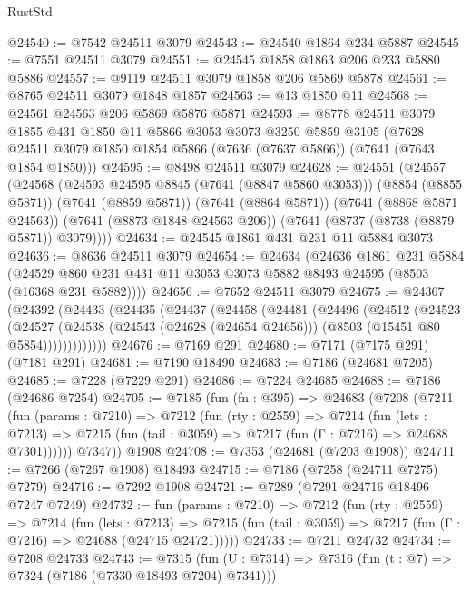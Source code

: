 \begin{lexlean}{RustStd}
\begin{coremodule}
{\begin{coremodule}
{{{{{{{{{{{{{{{{{{{{{{{{{{{{{{{{@24540 := @7542 @24511 @3079
@24543 := @24540 @1864 @234 @5887
@24545 := @7551 @24511 @3079
@24551 := @24545 @1858 @1863 @206 @233 @5880 @5886
@24557 := @9119 @24511 @3079 @1858 @206 @5869 @5878
@24561 := @8765 @24511 @3079 @1848 @1857
@24563 := @13 @1850 @11
@24568 := @24561 @24563 @206 @5869 @5876 @5871
@24593 := @8778
    @24511
    @3079
    @1855
    @431
    @1850
    @11
    @5866
    @3053
    @3073
    @3250
    @5859
    @3105
    (@7628 @24511 @3079 @1850 @1854 @5866 (@7636 (@7637 @5866)) (@7641 (@7643 @1854 @1850)))
@24595 := @8498 @24511 @3079
@24628 := @24551
    (@24557
      (@24568
        (@24593 @24595 @8845 (@7641 (@8847 @5860 @3053)))
        (@8854 (@8855 @5871))
        (@7641 (@8859 @5871))
        (@7641 (@8864 @5871))
        (@7641 (@8868 @5871 @24563))
        (@7641 (@8873 @1848 @24563 @206))
        (@7641 (@8737 (@8738 (@8879 @5871)) @3079))))
@24634 := @24545 @1861 @431 @231 @11 @5884 @3073
@24636 := @8636 @24511 @3079
@24654 := @24634
    (@24636
      @1861
      @231
      @5884
      (@24529 @860 @231 @431 @11 @3053 @3073 @5882 @8493 @24595 (@8503 (@16368 @231 @5882))))
@24656 := @7652 @24511 @3079
@24675 := @24367
    (@24392
      (@24433
        (@24435
          (@24437
            (@24458
              (@24481
                (@24496
                  (@24512
                    (@24523
                      (@24527
                        (@24538
                          (@24543 (@24628 (@24654 @24656)))
                          (@8503 (@15451 @80 @5854)))))))))))))
@24676 := @7169 @291
@24680 := @7171 (@7175 @291) (@7181 @291)
@24681 := @7190 @18490
@24683 := @7186 (@24681 @7205)
@24685 := @7228 (@7229 @291)
@24686 := @7224 @24685
@24688 := @7186 (@24686 @7254)
@24705 := @7185
    (fun (fn : @395) =>
    @24683
      (@7208
        (@7211
          (fun (params : @7210) =>
          @7212
            (fun (rty : @2559) =>
            @7214
              (fun (lets : @7213) =>
              @7215 (fun (tail : @3059) => @7217 (fun (Γ : @7216) => @24688 @7301))))))
        @7347))
    @1908
@24708 := @7353 (@24681 (@7203 @1908))
@24711 := @7266 (@7267 @1908) @18493
@24715 := @7186 (@7258 (@24711 @7275) @7279)
@24716 := @7292 @1908
@24721 := @7289 (@7291 @24716 @18496 @7247 @7249)
@24732 := fun (params : @7210) =>
  @7212
    (fun (rty : @2559) =>
    @7214
      (fun (lets : @7213) =>
      @7215 (fun (tail : @3059) => @7217 (fun (Γ : @7216) => @24688 (@24715 @24721)))))
@24733 := @7211 @24732
@24734 := @7208 @24733
@24743 := @7315
    (fun (U : @7314) => @7316 (fun (t : @7) => @7324 (@7186 (@7330 @18493 @7204) @7341)))
}}}}}}}}}}}}}}}}}}}}}}}}}}}}}}}}
\end{coremodule}}
\end{coremodule}
\end{lexlean}
